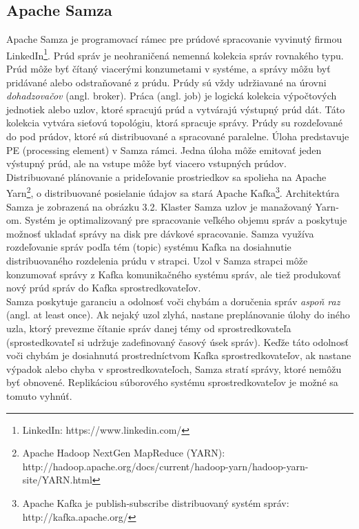 \subsection{Apache Samza}
Apache Samza \citep{kamburugamuvesurvey} je programovací rámec pre prúdové spracovanie vyvinutý firmou LinkedIn\footnote{LinkedIn: https://www.linkedin.com/}. Prúd správ je neohraničená nemenná kolekcia správ rovnakého typu. Prúd môže byť čítaný viacerými konzumetami v systéme, a správy môžu byť pridávané alebo odstraňované z prúdu. Prúdy sú vždy udržiavané na úrovni \textit{dohadzovačov} (angl. broker). Práca (angl. job) je logická kolekcia výpočtových jednotiek alebo uzlov, ktoré spracujú prúd a vytvárajú výstupný prúd dát. Táto kolekcia vytvára sieťovú topológiu, ktorá spracuje správy. Prúdy su rozdeľované do pod prúdov, ktoré sú distribuované a spracované paralelne. Úloha predstavuje PE (processing element) v Samza rámci. Jedna úloha môže emitovať jeden výstupný prúd, ale na vstupe môže byť viacero vstupných prúdov. 
\\[5pt]
Distribuované plánovanie a prideľovanie prostriedkov sa spolieha na Apache Yarn\footnote{Apache Hadoop NextGen MapReduce (YARN): http://hadoop.apache.org/docs/current/hadoop-yarn/hadoop-yarn-site/YARN.html}, o distribuované posielanie údajov sa stará Apache Kafka\footnote{Apache Kafka je publish-subscribe distribuovaný systém správ: http://kafka.apache.org/}. Architektúra Samza je zobrazená na obrázku 3.2.
Klaster Samza uzlov je manažovaný Yarn-om. Systém je optimalizovaný pre spracovanie veľkého objemu správ a poskytuje možnosť ukladať správy na disk pre dávkové spracovanie. Samza využíva rozdeľovanie správ podľa tém (topic) systému Kafka na dosiahnutie distribuovaného rozdelenia prúdu v strapci. Uzol v Samza strapci môže konzumovať správy z Kafka komunikačného systému správ, ale tiež produkovať nový prúd správ do Kafka sprostredkovateľov. 
\\[5pt]
Samza poskytuje garanciu a odolnosť voči chybám a doručenia správ \textit{aspoň raz} (angl. at least once). Ak nejaký uzol zlyhá, nastane preplánovanie úlohy do iného uzla, ktorý prevezme čítanie správ danej témy od sprostredkovateľa (sprostedkovateľ si udržuje zadefinovaný časový úsek správ). Keďže táto odolnosť voči chybám je dosiahnutá prostredníctvom Kafka sprostredkovateľov, ak nastane výpadok alebo chyba v sprostredkovateľoch, Samza stratí správy, ktoré nemôžu byť obnovené. Replikáciou súborového systému sprostredkovateľov je možné sa tomuto vyhnúť.

